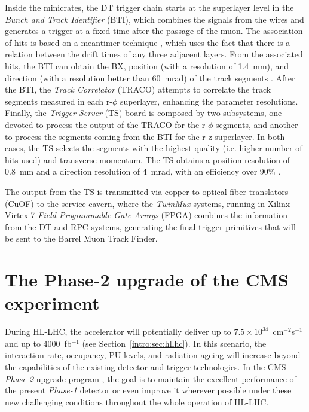 \documentclass[../main.tex]{subfiles}
\begin{document}
Inside the minicrates, the DT trigger chain starts at the superlayer level in the \textit{Bunch and Track Identifier} (BTI), which combines the signals from the wires and generates a trigger at a fixed time after the passage of the muon.  The association of hits is based on a meantimer technique \cite{intro:exp:meantimer}, which uses the fact that there is a relation between the drift times of any three adjacent layers. From the associated hits, the BTI can obtain the BX, position (with a resolution of 1.4~mm), and direction (with a resolution better than 60~mrad) of the track segments \cite{intro:exp:cms}. After the BTI, the \textit{Track Correlator} (TRACO) attempts to correlate the track segments measured in each r-$\phi$ superlayer, enhancing the parameter resolutions. Finally, the \textit{Trigger Server} (TS) board is composed by two subsystems, one devoted to process the output of the TRACO for the r-$\phi$ segments, and another to process the segments coming from the BTI for the r-z superlayer. In both cases, the TS selects the segments with the highest quality (i.e. higher number of hits used) and transverse momentum. The TS obtains a position resolution of 0.8~mm and a direction resolution of 4~mrad, with an efficiency over 90\% \cite{intro:exp:dt_performance}.

The output from the TS is transmitted via copper-to-optical-fiber translators (CuOF) to the service cavern, where the \textit{TwinMux} systems, running in Xilinx Virtex 7 \textit{Field Programmable Gate Arrays} (FPGA) combines the information from the DT and RPC systems, generating the final trigger primitives that will be sent to the Barrel Muon Track Finder.



\section{The Phase-2 upgrade of the CMS experiment}

During HL-LHC, the accelerator will potentially deliver up to $7.5\times10^{34}$~cm${}^{-2}$s${}^{-1}$ and up to 4000~fb${}^{-1}$ (see Section~\ref{intro:sec:hllhc}). In this scenario, the interaction rate, occupancy, PU levels, and radiation ageing will increase beyond the capabilities of the existing detector and trigger technologies. In the CMS \textit{Phase-2} upgrade program \cite{intro:exp:phase2_upgrade}, the goal is to maintain the excellent performance of the present \textit{Phase-1} detector or even improve it wherever possible under these new challenging conditions throughout the whole operation of HL-LHC.
\end{document}
